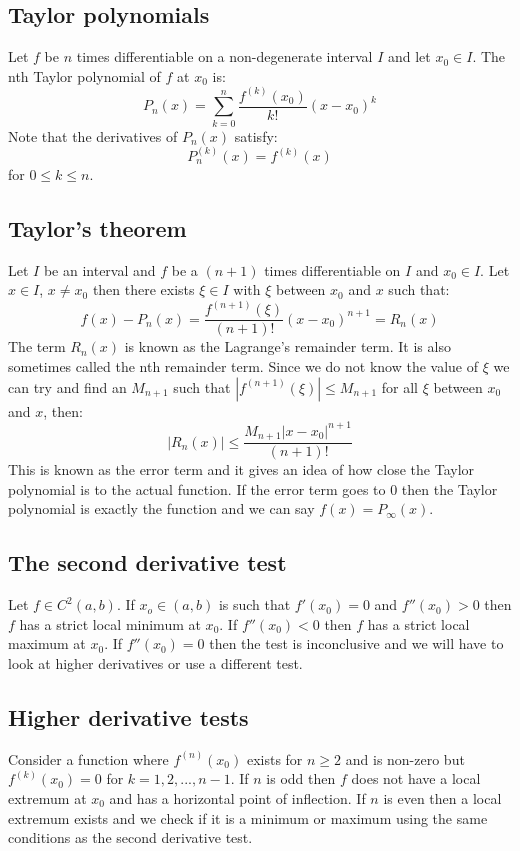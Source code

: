 \documentclass[12pt]{article}
\begin{document}
\subsection*{Taylor polynomials}
Let \(f\) be \(n\) times differentiable on a non-degenerate interval \(I\) and let \(x_0\in I\).  The nth Taylor polynomial of \(f\) at \(x_0\) is:
\[P_n(x)=\sum^n_{k=0}\frac{f^{(k)}(x_0)}{k!}(x-x_0)^{k}\]
Note that the derivatives of \(P_n(x)\) satisfy:
\[P_n^{(k)}(x)=f^{(k)}(x)\]
for \(0\leq k\leq n\).
\subsection*{Taylor's theorem}
Let \(I\) be an interval and \(f\) be a \((n+1)\) times differentiable on \(I\) and \(x_0\in I\). Let \(x\in I\), \(x\ne x_0\) then there exists \(\xi\in I\) with \(\xi\) between \(x_0\) and \(x\) such that:
\[f(x)-P_n(x)=\frac{f^{(n+1)}(\xi)}{(n+1)!}(x-x_0)^{n+1}=R_n(x)\]
The term \(R_n(x)\) is known as the Lagrange's remainder term. It is also sometimes called the nth remainder term. Since we do not know the value of \(\xi\) we can try and find an \(M_{n+1}\) such that \(|f^{(n+1)}(\xi)|\leq M_{n+1}\) for all \(\xi\) between \(x_0\) and \(x\), then:
\[|R_n(x)|\leq \frac{M_{n+1}|x-x_0|^{n+1}}{(n+1)!}\]
This is known as the error term and it gives an idea of how close the Taylor polynomial is to the actual function. If the error term goes to \(0\) then the Taylor polynomial is exactly the function and we can say \(f(x)=P_\infty(x)\).
\subsection*{The second derivative test}
Let \(f\in C^2(a,b)\). If \(x_o\in (a,b)\) is such that \(f'(x_0)=0\) and \(f''(x_0)>0\) then \(f\) has a strict local minimum at \(x_0\). If \(f''(x_0)<0\) then \(f\) has a strict local maximum at \(x_0\). If \(f''(x_0)=0\) then the test is inconclusive and we will have to look at higher derivatives or use a different test.
\subsection*{Higher derivative tests}
Consider a function where \(f^{(n)}(x_0)\) exists for \(n\geq 2\) and is non-zero but \(f^{(k)}(x_0)=0\) for \(k=1,2,...,n-1\). If \(n\) is odd then \(f\) does not have a local extremum at \(x_0\) and has a horizontal point of inflection. If \(n\) is even then a local extremum exists and we check if it is a minimum or maximum using the same conditions as the second derivative test.
\end{document}

